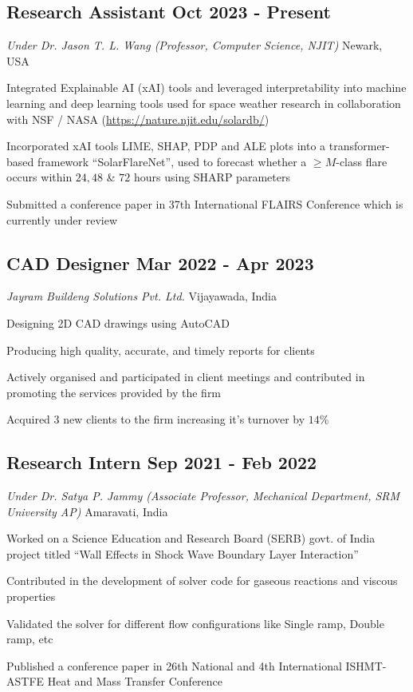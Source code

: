 \subsection{{Research Assistant \hfill  Oct 2023 - Present}}
{\textit{Under Dr. Jason T. L. Wang (Professor, Computer Science, NJIT)} \hfill Newark, USA}
\begin{zitemize}
\item {Integrated Explainable AI (xAI) tools and leveraged interpretability into machine learning and deep learning tools used for 
space weather research in collaboration with NSF / NASA (\url{https://nature.njit.edu/solardb/})}
\item {Incorporated xAI tools LIME, SHAP, PDP and ALE plots into a transformer-based framework ``SolarFlareNet'', used to forecast whether a $\geq M$-class 
flare occurs within $24, 48$ \& $72$ hours using SHARP parameters}
\item {Submitted a conference paper in 37th International FLAIRS Conference which is currently under review}
\end{zitemize}

\subsection{{CAD Designer \hfill Mar 2022 - Apr 2023}}
{\textit{Jayram Buildeng Solutions Pvt. Ltd.} \hfill Vijayawada, India}
\begin{zitemize}
\item {Designing 2D CAD drawings using AutoCAD}
\item {Producing high quality, accurate, and timely reports for clients}
\item {Actively organised and participated in client meetings and contributed in promoting the services provided by the firm}
\item {Acquired 3 new clients to the firm increasing it's turnover by $14\%$}
\end{zitemize}

\subsection{{Research Intern \hfill  Sep 2021 - Feb 2022}}
{\textit{Under Dr. Satya P. Jammy (Associate Professor, Mechanical Department, SRM University AP)} \hfill Amaravati, India}
\begin{zitemize}
\item {Worked on a Science Education and Research Board (SERB) govt. of India project titled ``Wall Effects in Shock Wave Boundary Layer Interaction''}
\item {Contributed in the development of solver code for gaseous reactions and viscous properties}
\item {Validated the solver for different flow configurations like Single ramp, Double ramp, etc}
\item {Published a conference paper in 26th National and 4th International ISHMT-ASTFE Heat and Mass Transfer Conference}
\end{zitemize}

